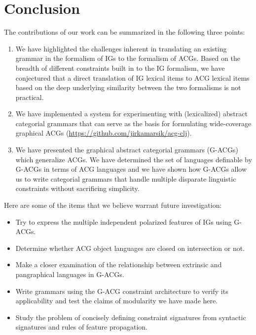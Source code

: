 \section{Conclusion}
\label{sec:conclusion}

The contributions of our work can be summarized in the following three
points:

\begin{enumerate}
\item We have highlighted the challenges inherent in translating an
  existing grammar in the formalism of IGs to the formalism of
  ACGs. Based on the breadth of different constraints built in to the IG
  formalism, we have conjectured that a direct translation of IG lexical
  items to ACG lexical items based on the deep underlying similarity
  between the two formalisms is not practical.

\item We have implemented a system for experimenting with (lexicalized)
  abstract categorial grammars that can serve as the basis for
  formulating wide-coverage graphical ACGs
  (\url{https://github.com/jirkamarsik/acg-clj}).

\item We have presented the graphical abstract categorial grammars
  (G-ACGs) which generalize ACGs. We have determined the set of
  languages definable by G-ACGs in terms of ACG languages and we have
  shown how G-ACGs allow us to write categorial grammars that handle
  multiple disparate linguistic constraints without sacrificing
  simplicity.
\end{enumerate}

Here are some of the items that we believe warrant future investigation:

\begin{itemize}
\item Try to express the multiple independent polarized features of IGs
  using G-ACGs.
\item Determine whether ACG object languages are closed on intersection
  or not.
\item Make a closer examination of the relationship between extrinsic
  and pangraphical languages in G-ACGs.
\item Write grammars using the G-ACG constraint architecture to verify
  its applicability and test the claims of modularity we have made here.
\item Study the problem of concisely defining constraint signatures from
  syntactic signatures and rules of feature propagation.
\end{itemize}
